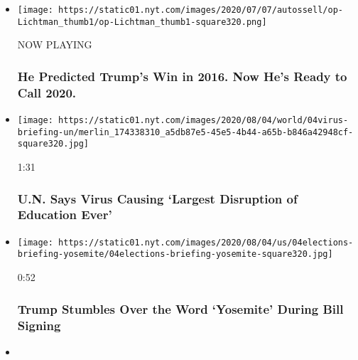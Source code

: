 \begin{itemize}
\item
  \texttt{[image: https://static01.nyt.com/images/2020/07/07/autossell/op-Lichtman\_thumb1/op-Lichtman\_thumb1-square320.png]}

  NOW PLAYING

  \hypertarget{he-predicted-trumps-win-in-2016-now-hes-ready-to-call-2020-2}{%
  \subsubsection{He Predicted Trump's Win in 2016. Now He's Ready to
  Call
  2020.}\label{he-predicted-trumps-win-in-2016-now-hes-ready-to-call-2020-2}}
\item
  \href{https://www.nytimes.com/video/us/100000007272762/un-secretary-generational-catastrophe-schools-reopen.html?action=click\&module=video-series-bar\&region=header\&pgtype=Article\&playlistId=video/latest-video}{}

  \texttt{[image: https://static01.nyt.com/images/2020/08/04/world/04virus-briefing-un/merlin\_174338310\_a5db87e5-45e5-4b44-a65b-b846a42948cf-square320.jpg]}

  1:31

  \hypertarget{un-says-virus-causing-largest-disruption-of-education-ever}{%
  \subsubsection{U.N. Says Virus Causing `Largest Disruption of
  Education
  Ever'}\label{un-says-virus-causing-largest-disruption-of-education-ever}}
\item
  \href{https://www.nytimes.com/video/us/100000007272140/trump-stumbles-over-yosemite.html?action=click\&module=video-series-bar\&region=header\&pgtype=Article\&playlistId=video/latest-video}{}

  \texttt{[image: https://static01.nyt.com/images/2020/08/04/us/04elections-briefing-yosemite/04elections-briefing-yosemite-square320.jpg]}

  0:52

  \hypertarget{trump-stumbles-over-the-word-yosemite-during-bill-signing}{%
  \subsubsection{Trump Stumbles Over the Word `Yosemite' During Bill
  Signing}\label{trump-stumbles-over-the-word-yosemite-during-bill-signing}}
\item
  \href{https://www.nytimes.com/video/world/100000007272075/lebanon-beirut-blast.html?action=click\&module=video-series-bar\&region=header\&pgtype=Article\&playlistId=video/latest-video}{}


\end{itemize}
